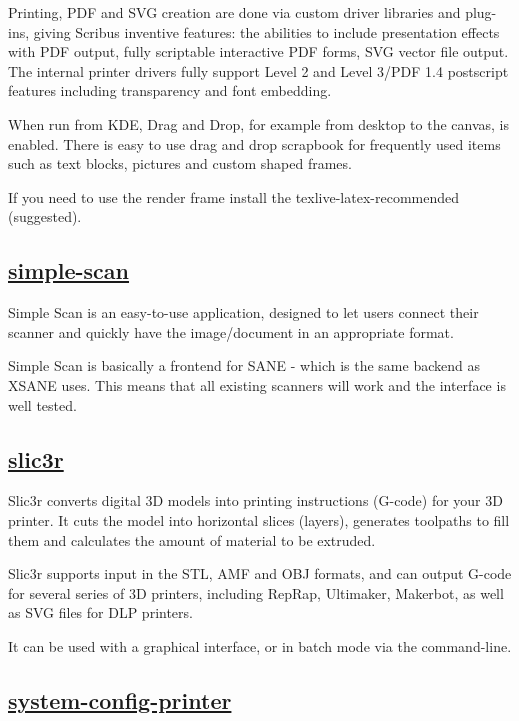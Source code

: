  Printing, PDF and SVG creation are done via custom driver libraries and
 plug-ins, giving Scribus inventive features: the abilities to include
 presentation effects with PDF output, fully scriptable interactive PDF
 forms, SVG vector file output. The internal printer drivers fully support
 Level 2 and Level 3/PDF 1.4 postscript features including transparency and
 font embedding.
 
 When run from KDE, Drag and Drop, for example from desktop to the canvas,
 is enabled. There is easy to use drag and drop scrapbook for frequently
 used items such as text blocks, pictures and custom shaped frames.
 
 If you need to use the render frame install the texlive-latex-recommended
 (suggested).

\subsection{\href{https://launchpad.net/simple-scan}{simple-scan}}

 Simple Scan is an easy-to-use application, designed to let users
 connect their scanner and quickly have the image/document in an
 appropriate format.
 
 Simple Scan is basically a frontend for SANE - which is the same
 backend as XSANE uses. This means that all existing scanners will
 work and the interface is well tested.

\subsection{\href{http://slic3r.org/}{slic3r}}

 Slic3r converts digital 3D models into printing instructions (G-code)
 for your 3D printer. It cuts the model into horizontal slices (layers),
 generates toolpaths to fill them and calculates the amount of material
 to be extruded.
 
 Slic3r supports input in the STL, AMF and OBJ formats, and can output
 G-code for several series of 3D printers, including RepRap, Ultimaker,
 Makerbot, as well as SVG files for DLP printers.
 
 It can be used with a graphical interface, or in batch mode via the
 command-line.

\subsection{\href{http://cyberelk.net/tim/software/system-config-printer/}{system-config-printer}}

